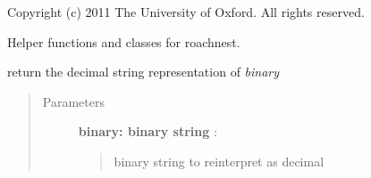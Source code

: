 \documentclass[letterpaper,10pt,english]{sphinxmanual}
\begin{document}
Copyright (c) 2011 The University of Oxford. All rights reserved.

Helper functions and classes for roachnest.


\begin{fulllineitems}
\label{index:roachnest_helpers.bin2dec}
return the decimal string representation of \emph{binary}
\begin{quote}\begin{description}
\item[{Parameters }] \leavevmode
\textbf{binary: binary string} :
\begin{quote}

binary string to reinterpret as decimal
\end{quote}

\end{description}\end{quote}

\end{fulllineitems}


\end{document}

